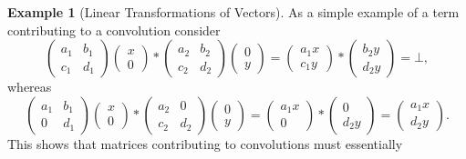 \documentclass[12pt]{article}
\theoremstyle{definition}
\newtheorem{example}{Example}
\begin{document}
\begin{example}[Linear Transformations of Vectors]
As a simple example of a term contributing to a convolution consider
\begin{equation*}
  \begin{pmatrix}
    a_1 & b_1\\
    c_1 & d_1
  \end{pmatrix}
  \begin{pmatrix}
    x\\
    0
  \end{pmatrix}
\ast
  \begin{pmatrix}
    a_2 & b_2\\
    c_2 & d_2
  \end{pmatrix}
  \begin{pmatrix}
    0\\
    y
  \end{pmatrix}
=
\begin{pmatrix}
  a_1x\\
  c_1y
\end{pmatrix}
\ast
\begin{pmatrix}
  b_2y\\
  d_2y
\end{pmatrix}
= \bot,
\end{equation*}
whereas
\begin{equation*}
  \begin{pmatrix}
    a_1 & b_1\\
    0 & d_1
  \end{pmatrix}
  \begin{pmatrix}
    x\\
    0
  \end{pmatrix}
\ast
  \begin{pmatrix}
    a_2 & 0\\
    c_2 & d_2
  \end{pmatrix}
  \begin{pmatrix}
    0\\
    y
  \end{pmatrix}
=
\begin{pmatrix}
  a_1x\\
  0
\end{pmatrix}
\ast
\begin{pmatrix}
  0\\
  d_2y
\end{pmatrix}
= 
\begin{pmatrix}
  a_1x\\
d_2y
\end{pmatrix}.
\end{equation*}
This shows that matrices contributing to convolutions must essentially

\end{example}
\end{document}
